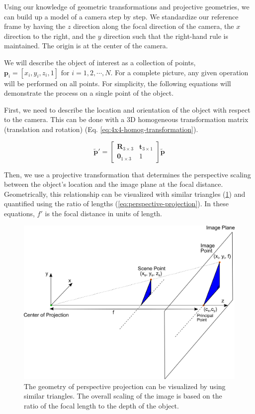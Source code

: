 Using our knowledge of geometric transformations and projective geometries, we can build up a model of a camera step by step. We standardize our reference frame by having the $z$ direction along the focal direction of the camera, the $x$ direction to the right, and the $y$ direction such that the right-hand rule is maintained. The origin is at the center of the camera.

We will describe the object of interest as a collection of points, $\mathbf{p}_i =  [x_i, y_i, z_i, 1] \text{ for } i = 1,2,\cdots,N$. For a complete picture, any given operation will be performed on all points. For simplicity, the following equations will demonstrate the process on a single point of the object.

First, we need to describe the location and orientation of the object with respect to the camera. This can be done with a 3D homogeneous transformation matrix (translation and rotation) (Eq. \ref{eq:4x4-homog-transformation}).

\begin{equation}
    \tilde{\mathbf{p}}' = \begin{bmatrix}
        \mathbf{R}_{3 \times 3} & \mathbf{t}_{3 \times 1} \\ \mathbf{0}_{1 \times 3} & 1
    \end{bmatrix} \tilde{\mathbf{p}}
    \label{eq:4x4-homog-transformation}
\end{equation}

Then, we use a projective transformation that determines the perspective scaling between the object's location and the image plane at the focal distance. Geometrically, this relationship can be visualized with similar triangles (\cref{fig:perspective-projection}) and quantified using the ratio of lengths (\cref{eq:perspective-projection}). In these equations, $f'$ is the focal distance in units of length.

\begin{figure}[h!]
    \begin{center}
        \includegraphics[width=0.85\linewidth]{figs/background/png/perspective-projection.png}
    \end{center}
    \caption{The geometry of perspective projection can be visualized by using similar triangles. The overall scaling of the image is based on the ratio of the focal length to the depth of the object.}
    \label{fig:perspective-projection}
\end{figure}


